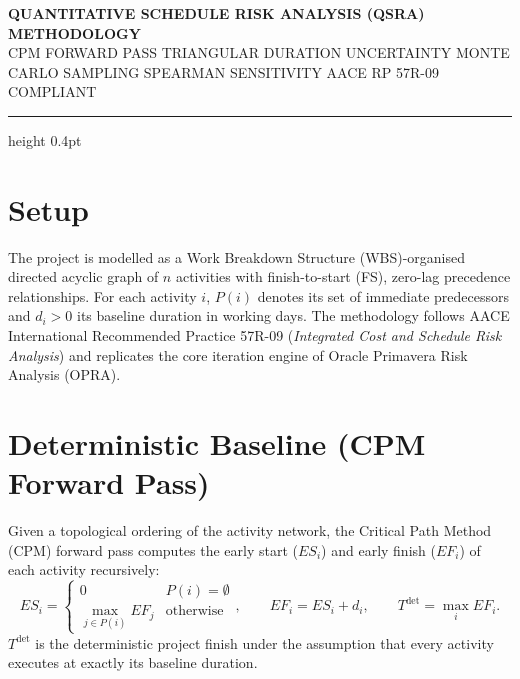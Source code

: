\documentclass[10pt]{article}
\begin{document}
\noindent
{\ttfamily\small\bfseries QUANTITATIVE SCHEDULE RISK ANALYSIS (QSRA) \textbar{} METHODOLOGY}\\[2pt]
{\ttfamily\scriptsize\color{muted}CPM FORWARD PASS \textbar{} TRIANGULAR DURATION UNCERTAINTY \textbar{} MONTE CARLO SAMPLING \textbar{} SPEARMAN SENSITIVITY \textbar{} AACE RP 57R-09 COMPLIANT}

\vspace{4pt}
\hrule height 0.4pt
\vspace{4pt}

\section{Setup}
The project is modelled as a Work Breakdown Structure (WBS)-organised directed acyclic graph of $n$ activities with finish-to-start (FS), zero-lag precedence relationships. For each activity $i$, $P(i)$ denotes its set of immediate predecessors and $d_i > 0$ its baseline duration in working days. The methodology follows AACE International Recommended Practice 57R-09 (\emph{Integrated Cost and Schedule Risk Analysis}) and replicates the core iteration engine of Oracle Primavera Risk Analysis (OPRA).

\section{Deterministic Baseline (CPM Forward Pass)}
Given a topological ordering of the activity network, the Critical Path Method (CPM) forward pass computes the early start ($ES_i$) and early finish ($EF_i$) of each activity recursively:
\begin{equation}
ES_i = \begin{cases} 0 & P(i) = \emptyset \\ \displaystyle\max_{j \in P(i)} EF_j & \text{otherwise} \end{cases}, \qquad EF_i = ES_i + d_i, \qquad T^{\text{det}} = \max_{i} EF_i.
\end{equation}
$T^{\text{det}}$ is the deterministic project finish under the assumption that every activity executes at exactly its baseline duration.
\end{document}
